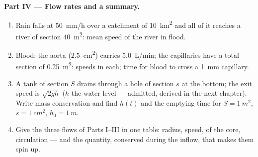\begin{problem}
\medskip
\noindent\textbf{Part IV --- Flow rates and a summary.}
\begin{enumerate}[resume]
  \item Rain falls at \qty{50}{mm/h} over a catchment of \qty{10}{km^2}
        and all of it reaches a river of section \qty{40}{m^2}: mean
        speed of the river in flood.
  \item Blood: the aorta (\qty{2.5}{cm^2}) carries \qty{5.0}{L/min}; the
        capillaries have a total section of \qty{0.25}{m^2}: speeds in
        each; time for blood to cross a \qty{1}{mm} capillary.
  \item A tank of section $S$ drains through a hole of section $s$ at
        the bottom; the exit speed is $\sqrt{2gh}$ ($h$ the water level
        --- admitted, derived in the next chapter). Write mass
        conservation and find $h(t)$ and the emptying time for
        $S = \qty{1}{m^2}$, $s = \qty{1}{cm^2}$, $h_0 = \qty{1}{m}$.
  \item Give the three flows of Parts I--III in one table: radius,
        speed,  of the core, circulation --- and the
        quantity, conserved during the inflow, that makes them spin
        up.
\end{enumerate}
\end{problem}

